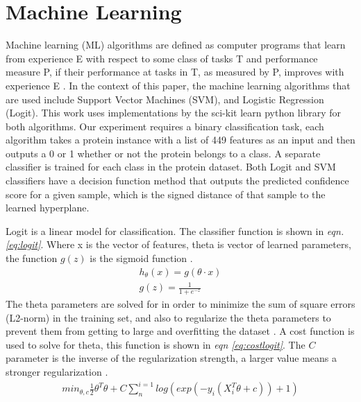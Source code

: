 \documentclass[ms]{nuthesis}
\begin{document}
\section{Machine Learning}
\par Machine learning (ML) algorithms are defined as computer programs that learn from experience E
with respect to some class of tasks T and performance measure P, if their performance at
tasks in T, as measured by P, improves with experience E \cite{mitchell}. In the context of this paper,
the machine learning algorithms that are used include Support Vector Machines (SVM), and Logistic Regression (Logit).
 This work uses implementations by the sci-kit learn python library \cite{scikit-learn} for both algorithms. Our
 experiment requires a binary classification task, each algorithm takes a protein instance with a list of 449 features
 as an input and then outputs a 0 or 1 whether or not the protein belongs to a class. A separate classifier is trained
 for each class in the protein dataset. Both Logit and SVM classifiers have a decision function method that outputs
 the predicted confidence score for a given sample, which is the signed distance of that sample to the learned
 hyperplane.
 \par Logit is a linear model for classification. The classifier function is shown in \textit{eqn. \ref{eq:logit}}.
 Where x is the vector of features, theta is vector of learned parameters, the function $g(z)$ is the sigmoid
 function \cite{Coursera}.
\FloatBarrier
\begin{equation}
\label{eq:logit}
\begin{aligned}
h_{\theta}(x) = g(\theta \cdot x) \\
g(z) = \frac{1}{1+e^{-z}}
\end{aligned}
\end{equation}
\FloatBarrier
The theta parameters are solved for in order to minimize the sum of square errors (L2-norm)
in the training set, and also to regularize the theta parameters to prevent them from getting to large
and overfitting the dataset \cite{scikit-learn}. A cost function is used to solve for theta, this
function is shown in \textit{eqn \ref{eq:costlogit}}. The $C$ parameter is the inverse of the regularization
strength, a larger value means a stronger regularization \cite{scikit-learn}.
\FloatBarrier
\begin{equation}
\label{eq:costlogit}
\begin{aligned}
min_{\theta,c}\frac{1}{2}\theta^{T}\theta + C\sum_{n}^{i=1}log(exp(-y_i(X_{i}^{T}\theta+c))+1)
\end{aligned}
\end{equation}
\end{document}
